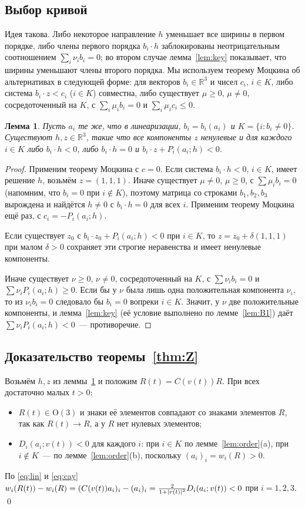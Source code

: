 \documentclass[11pt]{article}
\newtheorem{lemma}[theorem]{Лемма}
\theoremstyle{definition}
\theoremstyle{remark}
\newcommand{\R}{\mathbb{R}}
\newcommand{\Ort}{\mathrm{O}(3)}
\DeclarePairedDelimiter{\abs}{\lvert}{\rvert}
\begin{document}
\subsection{Выбор кривой}
Идея такова. Либо некоторое направление $h$ уменьшает все ширины в первом порядке, либо члены первого
порядка $b_i\cdot h$ заблокированы неотрицательным соотношением $\sum_i\nu_ib_i=0$; во втором случае
лемма~\ref{lem:key} показывает, что ширины уменьшают члены второго порядка.
Мы используем теорему Моцкина об альтернативах \cite[Satz~D6]{Motzkin1936} в следующей форме:
для векторов $b_i\in\R^3$ и чисел $c_i$, $i\in K$, либо система $b_i\cdot z<c_i$ ($i\in K$)
совместна, либо существует $\mu\ge0$, $\mu\ne0$, сосредоточенный на $K$, с $\sum_i\mu_ib_i=0$ и
$\sum_i\mu_ic_i\le0$.

\begin{lemma}\label{lem:choice}
Пусть $a_i$ те же, что в линеаризации, $b_i=b_i(a_i)$ и $K=\{i:b_i\ne0\}$. Существуют
$h,z\in\R^3$, такие что все компоненты $z$ ненулевые и для каждого $i\in K$ либо $b_i\cdot h<0$,
либо $b_i\cdot h=0$ и $b_i\cdot z+P_i(a_i;h)<0$.
\end{lemma}

\begin{proof}
Применим теорему Моцкина с $c=0$. Если система $b_i\cdot h<0$, $i\in K$, имеет решение $h$, возьмём
$z=(1,1,1)$. Иначе существует $\mu\ne0$, $\mu\ge0$, с $\sum\mu_ib_i=0$ (напомним, что $b_i=0$ при
$i\notin K$), поэтому матрица со строками $b_1,b_2,b_3$ вырождена и найдётся $h\ne0$ с
$b_i\cdot h=0$ для всех $i$. Применим теорему Моцкина ещё раз, с $c_i=-P_i(a_i;h)$.

Если существует $z_0$ с $b_i\cdot z_0+P_i(a_i;h)<0$ при $i\in K$, то $z=z_0+\delta(1,1,1)$ при малом
$\delta>0$ сохраняет эти строгие неравенства и имеет ненулевые компоненты.

Иначе существует $\nu\ge0$, $\nu\ne0$, сосредоточенный на $K$, с $\sum\nu_ib_i=0$ и
$\sum\nu_iP_i(a_i;h)\ge0$. Если бы у $\nu$ была лишь одна положительная компонента $\nu_i$, то из
$\nu_ib_i=0$ следовало бы $b_i=0$ вопреки $i\in K$. Значит, у $\nu$ две положительные компоненты, и
лемма~\ref{lem:key} (её условие выполнено по лемме~\ref{lem:B1}) даёт $\sum\nu_iP_i(a_i;h)<0$~---
противоречие.
\end{proof}

\subsection{Доказательство теоремы~\ref{thm:Z}}
Возьмём $h,z$ из леммы~\ref{lem:choice} и положим $R(t)=C(v(t))R$. При всех достаточно малых $t>0$:
\begin{itemize}
\item $R(t)\in\Ort$ и знаки её элементов совпадают со знаками элементов $R$, так как $R(t)\to R$, а
у $R$ нет нулевых элементов;
\item $D_i(a_i;v(t))<0$ для каждого $i$: при $i\in K$ по лемме~\ref{lem:order}(a), при $i\notin K$~---
по лемме~\ref{lem:order}(b), поскольку $(a_i)_i=w_i(R)>0$.
\end{itemize}
По \eqref{eq:lin} и \eqref{eq:cay}
$w_i(R(t))-w_i(R)=(C(v(t))a_i)_i-(a_i)_i=\frac{2}{1+\abs{v(t)}^2}D_i(a_i;v(t))<0$ при $i=1,2,3$.
\qed
\end{document}
